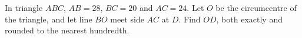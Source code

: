 In triangle $ABC$, $AB=28$, $BC=20$ and $AC=24$. Let $O$ be the circumcentre of the triangle, and let line $BO$ meet side $AC$ at $D$. Find $OD$, both exactly and rounded to the nearest hundredth.

